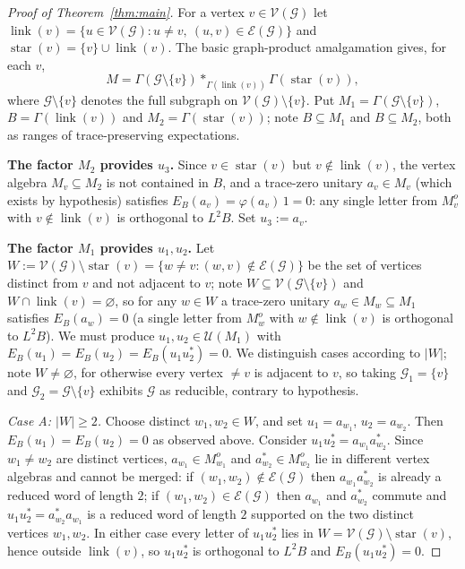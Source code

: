 \documentclass[a4paper, 11pt, reqno]{amsart}
\numberwithin{equation}{section}
\theoremstyle{plain}
\theoremstyle{remark}
\theoremstyle{definition}
\newcommand{\VV}{{\mathcal V}}
\newcommand{\EE}{{\mathcal E}}
\newcommand{\GG}{{\mathcal G}}
\begin{document}
\begin{proof}[Proof of Theorem~\ref{thm:main}]
For a vertex $v\in\VV(\GG)$ let $\operatorname{link}(v)=\{u\in\VV(\GG):u\neq v,\ (u,v)\in\EE(\GG)\}$ and $\operatorname{star}(v)=\{v\}\cup\operatorname{link}(v)$. The basic graph-product amalgamation \cite{Gr90,CaFi17} gives, for each $v$,
\begin{equation}\label{eq:star-decomp}
M=\Gamma(\GG\setminus\{v\})*_{\Gamma(\operatorname{link}(v))}\Gamma(\operatorname{star}(v)),
\end{equation}
where $\GG\setminus\{v\}$ denotes the full subgraph on $\VV(\GG)\setminus\{v\}$. Put $M_1=\Gamma(\GG\setminus\{v\})$, $B=\Gamma(\operatorname{link}(v))$ and $M_2=\Gamma(\operatorname{star}(v))$; note $B\subseteq M_1$ and $B\subseteq M_2$, both as ranges of trace-preserving expectations.

\medskip\noindent\textbf{The factor $M_2$ provides $u_3$.}
Since $v\in\operatorname{star}(v)$ but $v\notin\operatorname{link}(v)$, the vertex algebra $M_v\subseteq M_2$ is not contained in $B$, and a trace-zero unitary $a_v\in M_v$ (which exists by hypothesis) satisfies $E_B(a_v)=\varphi(a_v)\,1=0$: any single letter from $M_v^o$ with $v\notin\operatorname{link}(v)$ is orthogonal to $L^2B$. Set $u_3:=a_v$.

\medskip\noindent\textbf{The factor $M_1$ provides $u_1,u_2$.}
Let $W:=\VV(\GG)\setminus\operatorname{star}(v)=\{w\neq v:(w,v)\notin\EE(\GG)\}$ be the set of vertices distinct from $v$ and not adjacent to $v$; note $W\subseteq\VV(\GG\setminus\{v\})$ and $W\cap\operatorname{link}(v)=\varnothing$, so for any $w\in W$ a trace-zero unitary $a_w\in M_w\subseteq M_1$ satisfies $E_B(a_w)=0$ (a single letter from $M_w^o$ with $w\notin\operatorname{link}(v)$ is orthogonal to $L^2B$). We must produce $u_1,u_2\in\mathcal U(M_1)$ with $E_B(u_1)=E_B(u_2)=E_B(u_1u_2^*)=0$. We distinguish cases according to $|W|$; note $W\neq\varnothing$, for otherwise every vertex $\neq v$ is adjacent to $v$, so taking $\GG_1=\{v\}$ and $\GG_2=\GG\setminus\{v\}$ exhibits $\GG$ as reducible, contrary to hypothesis.

\emph{Case A: $|W|\ge2$.} Choose distinct $w_1,w_2\in W$, and set $u_1=a_{w_1}$, $u_2=a_{w_2}$. Then $E_B(u_1)=E_B(u_2)=0$ as observed above. Consider $u_1u_2^*=a_{w_1}a_{w_2}^*$. Since $w_1\neq w_2$ are distinct vertices, $a_{w_1}\in M_{w_1}^o$ and $a_{w_2}^*\in M_{w_2}^o$ lie in different vertex algebras and cannot be merged: if $(w_1,w_2)\notin\EE(\GG)$ then $a_{w_1}a_{w_2}^*$ is already a reduced word of length $2$; if $(w_1,w_2)\in\EE(\GG)$ then $a_{w_1}$ and $a_{w_2}^*$ commute and $u_1u_2^*=a_{w_2}^*a_{w_1}$ is a reduced word of length $2$ supported on the two distinct vertices $w_1,w_2$. In either case every letter of $u_1u_2^*$ lies in $W=\VV(\GG)\setminus\operatorname{star}(v)$, hence outside $\operatorname{link}(v)$, so $u_1u_2^*$ is orthogonal to $L^2B$ and $E_B(u_1u_2^*)=0$.


\end{proof}
\end{document}
